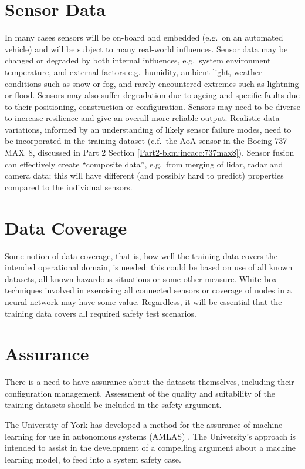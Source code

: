 \section{Sensor Data}
In many cases sensors will be on-board and embedded (e.g.\ on an automated vehicle) and will be subject to many real-world influences. Sensor data may be changed or degraded by both internal influences, e.g.\ system environment temperature, and external factors e.g.\ humidity, ambient light, weather conditions such as snow or fog, and rarely encountered extremes such as lightning or flood. 
Sensors may also suffer degradation due to ageing and specific faults due to their positioning, construction or configuration. Sensors may need to be diverse to increase resilience and give an overall more reliable output. Realistic data variations, informed by an understanding of likely sensor failure modes, need to be incorporated in the training \gls{dataset} (c.f.\ the AoA sensor in the Boeing 737 MAX~8, discussed in Part 2 Section \ref*{Part2-bkm:incacc:737max8}).
Sensor fusion can effectively create ``composite data'', e.g.\ from merging of lidar, radar and camera data; this will have different (and possibly hard to predict) properties compared to the individual sensors.

\section{Data Coverage}
Some notion of data coverage, that is, how well the training data covers the intended operational domain, is needed: this could be based on use of all known \glspl{dataset}, all known hazardous situations or some other measure. White box techniques involved in exercising all connected sensors or coverage of nodes in a neural network may have some value. Regardless, it will be essential that the training data covers all required safety test scenarios.

\section{ Assurance}
There is a need to have assurance about the \glspl{dataset} themselves, including their configuration management. Assessment of the quality and suitability of the training \glspl{dataset} should be included in the safety argument.

The University of York has developed a method for the assurance of machine learning for use in autonomous systems (AMLAS)
\cite{citation:machinelearning:amlas}.
The University's approach is intended to assist in the development of a compelling argument about a machine learning model,
to feed into a system safety case.

